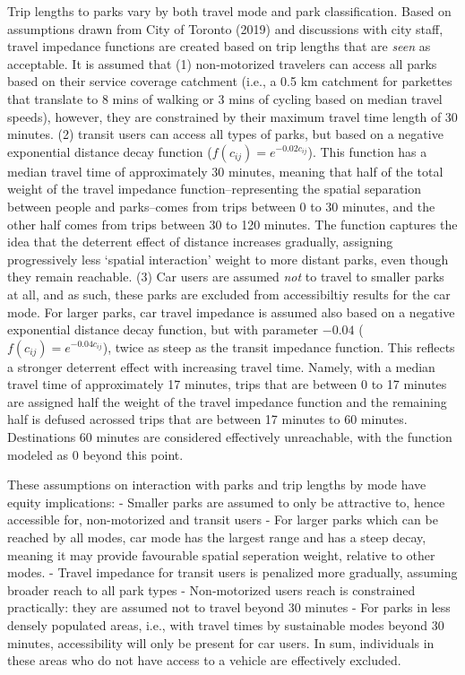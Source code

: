 \documentclass[
11pt, %
oneside, %
english, %
singlespacing, %
]{macthesis} %
\begin{document}
Trip lengths to parks vary by both travel mode and park classification. Based on assumptions drawn from City of Toronto (2019) and discussions with city staff, travel impedance functions are created based on trip lengths that are \emph{seen} as acceptable. It is assumed that (1) non-motorized travelers can access all parks based on their service coverage catchment (i.e., a 0.5 km catchment for parkettes that translate to 8 mins of walking or 3 mins of cycling based on median travel speeds), however, they are constrained by their maximum travel time length of 30 minutes. (2) transit users can access all types of parks, but based on a negative exponential distance decay function (\(f(c_{ij}) = e^{-0.02c_{ij}}\)). This function has a median travel time of approximately 30 minutes, meaning that half of the total weight of the travel impedance function--representing the spatial separation between people and parks--comes from trips between 0 to 30 minutes, and the other half comes from trips between 30 to 120 minutes. The function captures the idea that the deterrent effect of distance increases gradually, assigning progressively less `spatial interaction' weight to more distant parks, even though they remain reachable. (3) Car users are assumed \emph{not} to travel to smaller parks at all, and as such, these parks are excluded from accessibiltiy results for the car mode. For larger parks, car travel impedance is assumed also based on a negative exponential distance decay function, but with parameter \(-0.04\) (\(f(c_{ij}) = e^{-0.04c_{ij}}\)), twice as steep as the transit impedance function. This reflects a stronger deterrent effect with increasing travel time. Namely, with a median travel time of approximately 17 minutes, trips that are between 0 to 17 minutes are assigned half the weight of the travel impedance function and the remaining half is defused acrossed trips that are between 17 minutes to 60 minutes. Destinations 60 minutes are considered effectively unreachable, with the function modeled as 0 beyond this point.

These assumptions on interaction with parks and trip lengths by mode have equity implications:
- Smaller parks are assumed to only be attractive to, hence accessible for, non-motorized and transit users
- For larger parks which can be reached by all modes, car mode has the largest range and has a steep decay, meaning it may provide favourable spatial seperation weight, relative to other modes.
- Travel impedance for transit users is penalized more gradually, assuming broader reach to all park types
- Non-motorized users reach is constrained practically: they are assumed not to travel beyond 30 minutes
- For parks in less densely populated areas, i.e., with travel times by sustainable modes beyond 30 minutes, accessibility will only be present for car users. In sum, individuals in these areas who do not have access to a vehicle are effectively excluded.
\end{document}
